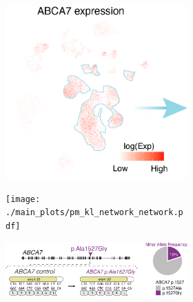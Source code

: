 \begin{figure}[H]
    \begin{subfigure}[t]{0.45\textwidth}
        \begin{subfigure}[t]{0.49\textwidth}
            \caption{}
            \includegraphics[width=\textwidth]{./main_plots/cell_projection_abca7_expression.png}        
        \end{subfigure}
        \begin{subfigure}[t]{0.49\textwidth}
            \caption{}
            \texttt{[image: ./main\_plots/pm\_kl\_network\_network.pdf]}        
        \end{subfigure}
        \begin{subfigure}[t]{\textwidth}
            \caption{}
            \includegraphics[width=\textwidth]{./main_plots/common_variant_cartoon.png}        
        \end{subfigure}
    \end{subfigure}
    \begin{subfigure}[t]{0.45\textwidth}

\end{subfigure}
\end{figure}
